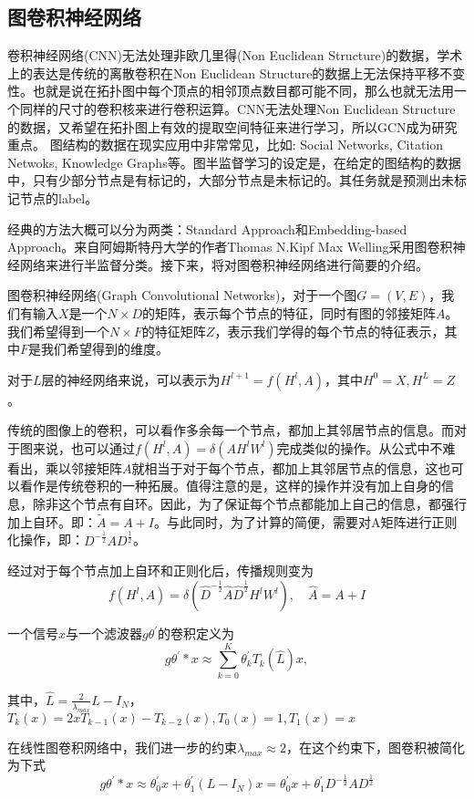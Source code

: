 \subsection{图卷积神经网络}
卷积神经网络(CNN)无法处理非欧几里得(Non Euclidean Structure)的数据，学术上的表达是传统的离散卷积在Non Euclidean Structure的数据上无法保持平移不变性。也就是说在拓扑图中每个顶点的相邻顶点数目都可能不同，那么也就无法用一个同样的尺寸的卷积核来进行卷积运算。CNN无法处理Non Euclidean Structure的数据，又希望在拓扑图上有效的提取空间特征来进行学习，所以GCN成为研究重点。
图结构的数据在现实应用中非常常见，比如: Social Networks, Citation Netwoks, Knowledge Graphs等。图半监督学习的设定是，在给定的图结构的数据中，只有少部分节点是有标记的，大部分节点是未标记的。其任务就是预测出未标记节点的label。

经典的方法大概可以分为两类：Standard Approach和Embedding-based Approach。来自阿姆斯特丹大学的作者Thomas N.Kipf Max Welling采用图卷积神经网络来进行半监督分类\cite{kipf2016semi}。接下来，将对图卷积神经网络进行简要的介绍。

图卷积神经网络(Graph Convolutional Networks)，对于一个图$G=(V,E)$，我们有输入$X$是一个$N\times D$的矩阵，表示每个节点的特征，同时有图的邻接矩阵$A$。我们希望得到一个$N\times F$的特征矩阵$Z$，表示我们学得的每个节点的特征表示，其中$F$是我们希望得到的维度。

对于$L$层的神经网络来说，可以表示为$H^{l+1}=f(H^l,A)$，其中$H^0=X,H^L=Z$。

传统的图像上的卷积，可以看作多余每一个节点，都加上其邻居节点的信息。而对于图来说，也可以通过$f(H^l,A)=\delta(AH^lW^l)$完成类似的操作。从公式中不难看出，乘以邻接矩阵$A$就相当于对于每个节点，都加上其邻居节点的信息，这也可以看作是传统卷积的一种拓展。值得注意的是，这样的操作并没有加上自身的信息，除非这个节点有自环。因此，为了保证每个节点都能加上自己的信息，都强行加上自环。即：$\widetilde{A}=A+I$。与此同时，为了计算的简便，需要对A矩阵进行正则化操作，即：$D^{-\frac{1}{2}}AD^{\frac{1}{2}}$。

经过对于每个节点加上自环和正则化后，传播规则变为
\[f(H^l,A)=\delta(\widehat{D}^{-\frac{1}{2}}\widehat{A}\widehat{D}^{\frac{1}{2}}H^lW^l),\quad \widehat{A}=A+I
\]

一个信号$x$与一个滤波器$g\theta^{'}$的卷积定义为
\[
g\theta^{'}*x \approx \sum_{k=0}^{K}\theta_k^{'}T_k(\widehat{L})x,
\]

其中，$\widehat{L}=\frac{2}{\lambda_{max}}L-I_{N}$，$T_k(x)=2xT_{k-1}(x)-T_{k-2}(x),T_{0}(x)=1,T_{1}(x)=x$

在线性图卷积网络中，我们进一步的约束$\lambda_{max}\approx2$，在这个约束下，图卷积被简化为下式
\[
g\theta^{'}*x \approx 
\theta_0^{'}x+\theta_1^{'}(L-I_N)x=\theta_0^{'}x+\theta_1^{'}D^{-\frac{1}{2}}AD^{\frac{1}{2}}
\]